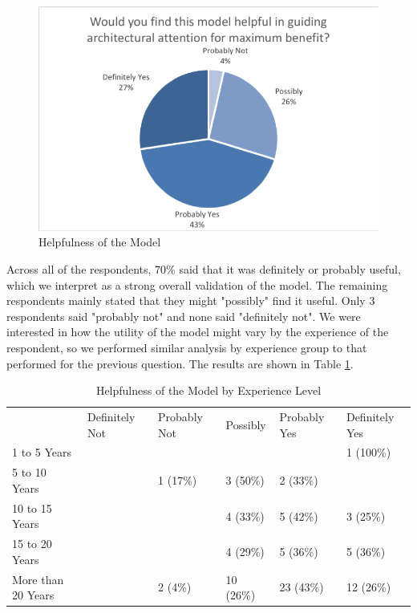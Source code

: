\begin{figure}[h]
\centering
\includegraphics[width=12cm,trim={2 2 2 2},clip]{Figures/prioritisation-helpfulness}
\caption{Helpfulness of the Model}
\label{figure:helpfulness}
\end{figure}

Across all of the respondents, 70\% said that it was definitely or probably useful, which we interpret as a strong overall validation of the model.  The remaining respondents mainly stated that they might "possibly" find it useful.  Only 3 respondents said "probably not" and none said "definitely not".
We were interested in how the utility of the model might vary by the experience of the respondent, so we performed similar analysis by experience group to that performed for the previous question.  The results are shown in Table \ref{table:helpfulness}.

\begin{table}
\caption{Helpfulness of the Model by Experience Level}
\label{table:helpfulness}
\footnotesize
\begin{tabular}{l p{1.5cm} p{1.5cm} p{1.5cm} p{1.5cm} p{1.5cm}}
 & Definitely Not & Probably Not & Possibly & Probably Yes & Definitely Yes \\
1 to 5 Years       & &          &           &           & 1 (100\%) \\
5 to 10 Years      & & 1 (17\%) & 3 (50\%)  & 2 (33\%)  & \\
10 to 15 Years	   & &          & 4 (33\%)  & 5 (42\%)  & 3 (25\%) \\
15 to 20 Years     & &          & 4 (29\%)  & 5 (36\%)  & 5 (36\%) \\
More than 20 Years & & 2 (4\%)  & 10 (26\%) & 23 (43\%) & 12 (26\%) \\
\end{tabular}
\end{table}

